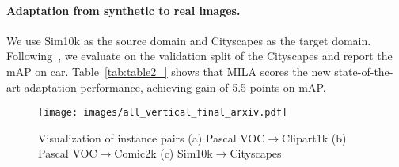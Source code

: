 \documentclass{bmvc2k}
\begin{document}
\paragraph{Adaptation from synthetic to real images.}
We use Sim10k as the source domain and Cityscapes as the target domain. Following~\cite{jiang2021decoupled}, we evaluate on the validation split of the Cityscapes and report the mAP on car. Table~\ref{tab:table2_} shows that MILA scores the new state-of-the-art adaptation performance, achieving gain of 5.5 points on mAP.
































































































\begin{figure*}[t!]
  \centering
  \texttt{[image: images/all\_vertical\_final\_arxiv.pdf]}
  \caption{Visualization of instance pairs (a) Pascal VOC$\xrightarrow{}$Clipart1k (b) Pascal VOC$\xrightarrow{}$Comic2k (c) Sim10k$\xrightarrow{}$Cityscapes}
  \label{fig:fig100}
\end{figure*}
\end{document}
